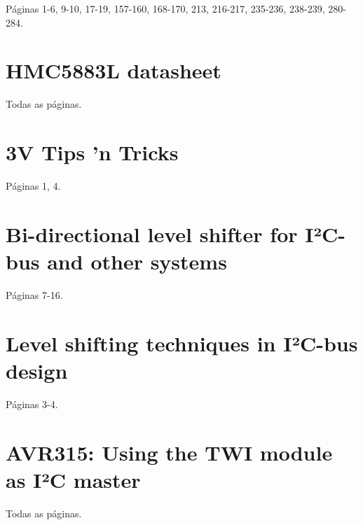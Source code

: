 \documentclass[brazil,pagestart=firstchapter]{abnt}
\begin{document}
Páginas 1-6, 9-10, 17-19, 157-160, 168-170, 213, 216-217, 235-236, 238-239, 280-284. \cite{ATmega8}




\chapter{HMC5883L datasheet}
\label{anx:hmc5883l_datasheet}

Todas as páginas. \cite{HMC5883L}




\chapter{3V Tips 'n Tricks}
\label{anx:3vtipsandtricks_pdf}

Páginas 1, 4. \cite{3vtipsandtricks}




\chapter{Bi-directional level shifter for I²C-bus and other systems}
\label{anx:AN97055_pdf}

Páginas 7-16. \cite{AN97055}




\chapter{Level shifting techniques in I²C-bus design}
\label{anx:AN10441_pdf}

Páginas 3-4. \cite{AN10441}




\chapter{AVR315: Using the TWI module as I²C master}
\label{anx:avr315_pdf}

Todas as páginas. \cite{AVR315}


\end{document}

